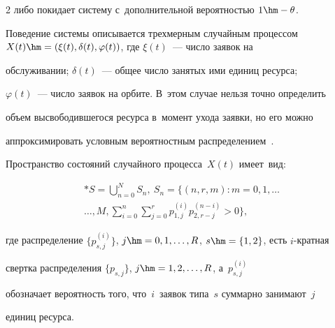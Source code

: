 \begin{multicols}{2}
либо покидает сис\-те\-му с~дополнительной ве\-ро\-ят\-ностью $1\hm-\theta$.



Поведение системы описывается трехмерным случайным процессом $X(t)\hm=\left( 

\xi(t), \delta(t), \varphi(t) \right)$, где $\xi (t)$~--- чис\-ло заявок на 

обслуживании; $\delta(t)$~--- общее чис\-ло занятых ими единиц ресурса; 

$\varphi(t)$~--- чис\-ло заявок на орбите. В~этом случае нельзя точ\-но определить 

объем высвободившегося ресурса в~момент ухода заявки, но его можно 

аппроксимировать условным вероятностным распределением~\cite{resmo, tutorial2022}.



Пространство со\-сто\-яний случайного процесса~$X(t)$ име\-ет~вид:



\vspace*{-6pt}



\noindent

\begin{multline*}

*\label{eqn:stateSpace}

     S=\mathop{\bigcup}\limits_{n=0}^N S_n, \

     S_n=\Bigg\{ (n,r,m): m=0,1,\ldots\\

     \ldots ,M, \sum\limits_{i=0}^n 

\sum\limits_{j=0}^r p_{1,j}^{(i )} p_{2,r-j}^{(n-i)}>0 \Bigg\},

\end{multline*}



\vspace*{-3pt}



\noindent

где распределение $\{ p_{s,j}^{(i)} \}$, $j\hm=0,1,\ldots ,R$, $s\hm=\{1,2\}$, есть $i$-крат\-ная 

сверт\-ка распределения $\{p_{s,j}\}$, $j\hm=1,2,\ldots ,R$, а~$p_{s,j}^{(i)}$ 

обозначает ве\-ро\-ят\-ность того, что~$i$~заявок типа~$s$ суммарно занимают~$j$ 

единиц ре\-сурса.




\end{multicols}
